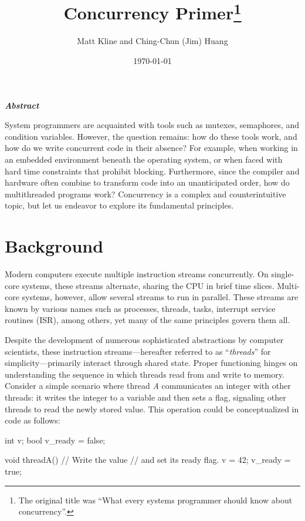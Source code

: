 \documentclass[fontsize=10pt, oneside]{scrartcl}
\title{\texorpdfstring{Concurrency Primer\footnote{%
The original title was ``What every systems programmer should know about concurrency''.}%
}{Concurrency Primer}}
\author{Matt Kline and Ching-Chun (Jim) Huang}
\date{\today}
\makeatletter
\let\runauthor\@author
\let\rundate\@date
\let\runtitle\@title
\makeatother
\begin{document}
\begin{center}
\Large \runtitle
\bigskip

\large
\runauthor
\smallskip

\normalsize
\rundate
\end{center}
\bigskip

\begin{center}
\large \bfseries\itshape Abstract
\end{center}
\smallskip

\noindent
System programmers are acquainted with tools such as mutexes, semaphores, and condition variables.
However, the question remains: how do these tools work, and how do we write concurrent code in their absence?
For example, when working in an embedded environment beneath the operating system,
or when faced with hard time constraints that prohibit blocking.
Furthermore, since the compiler and hardware often combine to transform code into an unanticipated order,
how do multithreaded programs work? Concurrency is a complex and counterintuitive topic,
but let us endeavor to explore its fundamental principles.
\bigskip

\section{Background}
\label{background}

Modern computers execute multiple instruction streams concurrently.
On single-core systems, these streams alternate, sharing the \textsc{CPU} in brief time slices.
Multi-core systems, however, allow several streams to run in parallel.
These streams are known by various names such as processes, threads, tasks,
interrupt service routines (ISR), among others, yet many of the same principles govern them all.

Despite the development of numerous sophisticated abstractions by computer scientists,
these instruction streams—hereafter referred to as ``\emph{threads}'' for simplicity—primarily interact through shared state.
Proper functioning hinges on understanding the sequence in which threads read from and write to memory.
Consider a simple scenario where thread \textit{A} communicates an integer with other threads:
it writes the integer to a variable and then sets a flag, signaling other threads to read the newly stored value.
This operation could be conceptualized in code as follows:
\begin{ccode}
int v;
bool v_ready = false;

void threadA()
{
    // Write the value
    // and set its ready flag.
    v = 42;
    v_ready = true;
}
\end{ccode}
\end{document}
